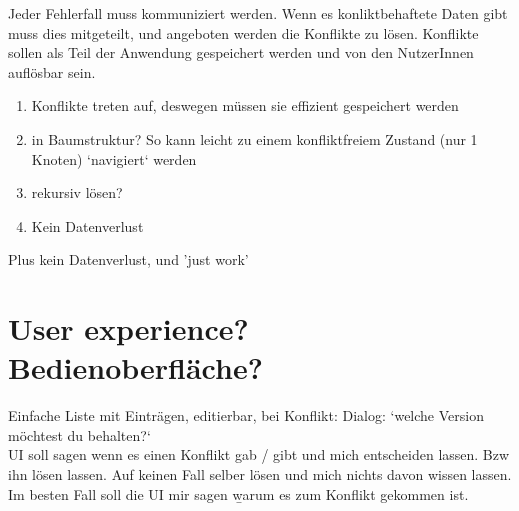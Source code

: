 Jeder Fehlerfall muss kommuniziert werden. Wenn es konliktbehaftete Daten gibt muss dies mitgeteilt, und angeboten werden die Konflikte zu lösen.
Konflikte sollen als Teil der Anwendung gespeichert werden und von den NutzerInnen auflösbar sein.


\begin{enumerate}

  \item Konflikte treten auf, deswegen müssen sie effizient gespeichert werden
  \item in Baumstruktur? So kann leicht zu einem konfliktfreiem Zustand (nur 1 Knoten) `navigiert` werden
  \item rekursiv lösen?

  \item Kein Datenverlust
\end{enumerate}
 Plus kein Datenverlust, und 'just work'
%
%
\section{User experience? Bedienoberfläche?}
Einfache Liste mit Einträgen, editierbar, bei Konflikt: Dialog: `welche Version möchtest du behalten?`\\
\gls{UI} soll sagen wenn es einen Konflikt gab / gibt und mich entscheiden lassen. Bzw ihn lösen lassen.
Auf keinen Fall selber lösen und mich nichts davon wissen lassen.
Im besten Fall soll die \gls{UI} mir sagen \b{warum} es zum Konflikt gekommen ist.\\
